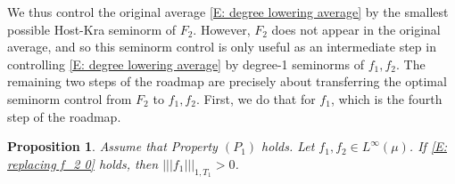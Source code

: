 \documentclass[11pt]{amsart}
\newtheorem{proposition}[lemma]{Proposition}
\theoremstyle{definition}
\newcommand{\nnorm}[1]{\lvert\!|\!| #1|\!|\!\rvert}
\newcommand{\1}{{\mathbf{1}}}
\begin{document}
We thus control the original average \eqref{E: degree lowering average} by the smallest possible Host-Kra seminorm of $F_2$. However, $F_2$ does not appear in the original average, and so this seminorm control is only useful as an intermediate step in controlling \eqref{E: degree lowering average} by degree-1 seminorms of $f_1, f_2$. The remaining two steps of the roadmap are precisely about transferring the optimal seminorm control from $F_2$ to  $f_1, f_2$. First, we do that for $f_1$, which is the fourth step of the roadmap.
\begin{proposition}\label{P: transferring control to f_j except 2}
    Assume that Property $(P_1)$ holds. Let $f_1, f_2\in L^\infty(\mu)$.
    If \eqref{E: replacing f_2 0} holds, then $\nnorm{f_1}_{1,T_1}>0$.
\end{proposition}
\end{document}
